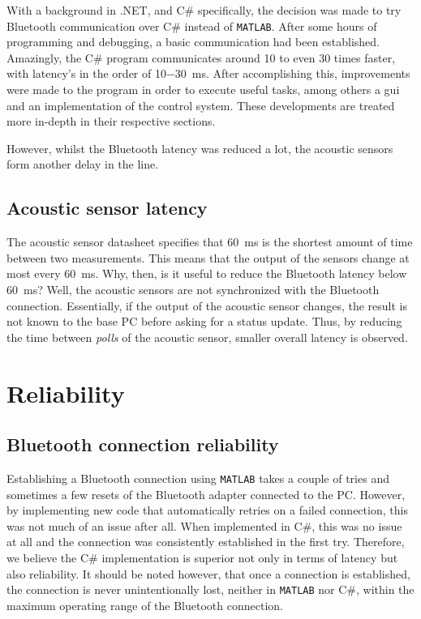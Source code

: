 \documentclass[11pt,titlepage]{report}
\begin{document}
With a background in .NET, and C\# specifically, the decision was made to try Bluetooth communication over C\# instead of \texttt{MATLAB}. After some hours of programming and debugging, a basic communication had been established. Amazingly, the C\# program communicates around 10 to even 30 times faster, with latency's in the order of \SI{10-30}{ms}. After accomplishing this, improvements were made to the program in order to execute useful tasks, among others a gui and an implementation of the control system. These developments are treated more in-depth in their respective sections.

However, whilst the Bluetooth latency was reduced a lot, the acoustic sensors form another delay in the line.
\subsection{Acoustic sensor latency}
The acoustic sensor datasheet specifies that \SI{60}{ms} is the shortest amount of time between two measurements. This means that the output of the sensors change at most every \SI{60}{ms}. Why, then, is it useful to reduce the Bluetooth latency below \SI{60}{ms}? Well, the acoustic sensors are not synchronized with the Bluetooth connection. Essentially, if the output of the acoustic sensor changes, the result is not known to the base PC before asking for a status update. Thus, by reducing the time between \textit{polls} of the acoustic sensor, smaller overall latency is observed.

\section{Reliability}
\subsection{Bluetooth connection reliability}
Establishing a Bluetooth connection using \texttt{MATLAB} takes a couple of tries and sometimes a few resets of the Bluetooth adapter connected to the PC. However, by implementing new code that automatically retries on a failed connection, this was not much of an issue after all. When implemented in C\#, this was no issue at all and the connection was consistently established in the first try. Therefore, we believe the C\# implementation is superior not only in terms of latency but also reliability. It should be noted however, that once a connection is established, the connection is never unintentionally lost, neither in \texttt{MATLAB} nor C\#, within the maximum operating range of the Bluetooth connection.
\end{document}
